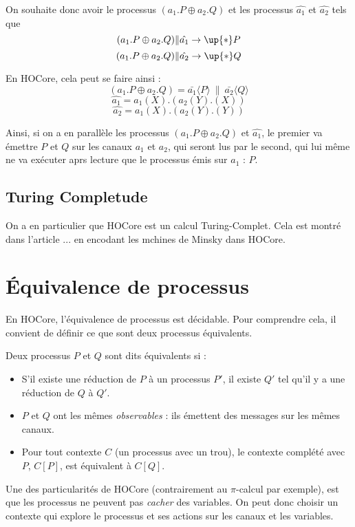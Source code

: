\documentclass[11pt]{article}
\def\pic{$\pi$-calcul }
\def\+{\oplus}
\begin{document}
On souhaite donc avoir le processus $(a_1.P\+ a_2.Q)$ et les processus $\hat{a_1}$ et $\hat{a_2}$ tels que
$$(a_1.P\+ a_2.Q)\|\hat{a_1}\rightarrow\up{*}P$$
$$(a_1.P\+ a_2.Q)\|\hat{a_2}\rightarrow\up{*}Q$$

En HOCore, cela peut se faire ainsi :
$$(a_1.P\+ a_2.Q) = \bar{a_1}\langle P\rangle\ \|\ \bar{a_2}\langle Q\rangle$$
$$\hat{a_1} = a_1(X).(a_2(Y).(X))$$
$$\hat{a_2} = a_1(X).(a_2(Y).(Y))$$

Ainsi, si on a en parallèle les processus $(a_1.P\+ a_2.Q)$ et  $\hat{a_1}$, le premier va émettre $P$ et $Q$ sur les canaux $a_1$ et $a_2$, qui seront lus par le second, qui lui même ne va exécuter aprs lecture que le processus émis sur $a_1$ : $P$. %

\subsection{Turing Completude}
On a en particulier que HOCore est un calcul Turing-Complet. %
Cela est montré dans l'article ... en encodant les mchines de Minsky dans HOCore.


\section{Équivalence de processus}
En HOCore, l'équivalence de processus est décidable. Pour comprendre cela, il convient de définir ce que sont deux processus équivalents.

Deux processus $P$ et $Q$ sont dits équivalents si :
\begin{itemize}
\item S'il existe une réduction de $P$ à un processus $P'$, il existe $Q'$ tel qu'il y a une réduction de $Q$ à $Q'$. %
\item $P$ et $Q$ ont les mêmes \textit{observables} : ils émettent des messages sur les mêmes canaux.  
\item Pour tout contexte $C$ (un processus avec un trou), le contexte complété avec $P$, $C[P]$, est équivalent à $C[Q]$.
\end{itemize}
Une des particularités de HOCore (contrairement au \pic par exemple), est que les processus ne peuvent pas \textit{cacher} des variables. On peut donc choisir un contexte qui explore le processus et ses actions sur les canaux et les variables.
\end{document}
